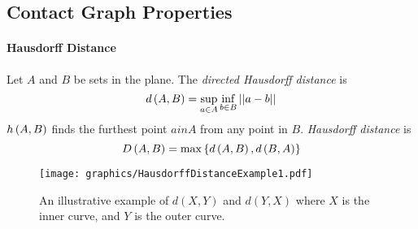 \subsection{Contact Graph Properties}
\paragraph{Hausdorff Distance}  Let $A$ and $B$ be sets in the plane. The \textit{directed Hausdorff distance} is 
\begin{equation}\label{eqn:ContactGraphV3-1}
d\left( A,B \right) = \sup_{a \in A} \inf_{b \in B} \left\vert\left\vert a-b \right\vert \right\vert
\end{equation}
$h\left( A,B \right)$ finds the furthest point $a in A$ from any point in $B$.  \textit{Hausdorff distance} is
\begin{equation}\label{eqn:ContactGraphV3-2}
D\left( A,B \right) = \max \left\lbrace d\left( A,B \right), d\left( B,A \right) \right\rbrace
\end{equation}
\begin{figure}[!htbp]
\begin{center}
\texttt{[image: graphics/HausdorffDistanceExample1.pdf]}
\caption{An illustrative example of $d(X,Y)$ and $d(Y,X)$ where $X$ is the inner curve, and $Y$ is the outer curve.}\label{fig:HausdorffDistanceExample1.pdf}
\end{center}
\end{figure}
